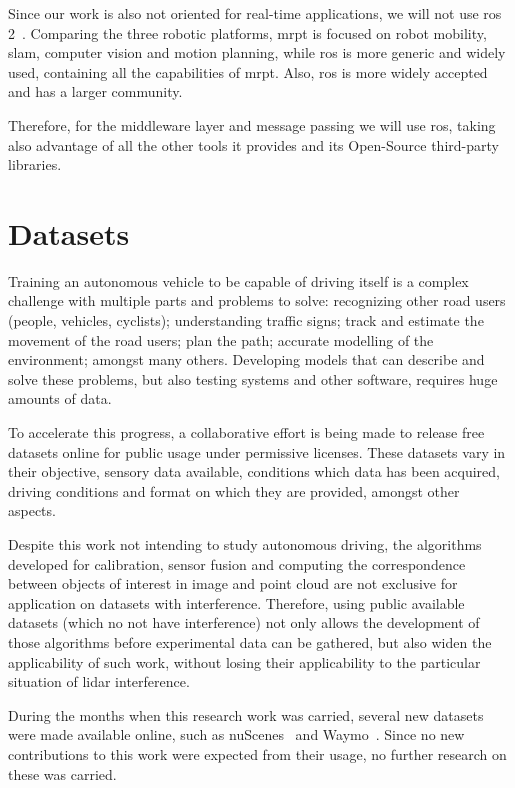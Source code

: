 Since our work is also not oriented for real-time applications, we will not use \ac{ros} 2~\cite{ROS2}. Comparing the three robotic platforms, \ac{mrpt} is focused on robot mobility, \ac{slam}, computer vision and motion planning, while \ac{ros} is more generic and widely used, containing all the capabilities of \ac{mrpt}. Also, \ac{ros} is more widely accepted and has a larger community.

Therefore, for the middleware layer and message passing we will use \ac{ros}, taking also advantage of all the other tools it provides and its Open-Source third-party libraries.



\section{Datasets}
\label{sec:sota:datasets}

Training an autonomous vehicle to be capable of driving itself is a complex challenge with multiple parts and problems to solve: recognizing other road users (people, vehicles, cyclists); understanding traffic signs; track and estimate the movement of the road users; plan the path; accurate modelling of the environment; amongst many others. Developing models that can describe and solve these problems, but also testing systems and other software, requires huge amounts of data.

To accelerate this progress, a collaborative effort is being made to release free datasets online for public usage under permissive licenses. These datasets vary in their objective, sensory data available, conditions which data has been acquired, driving conditions and format on which they are provided, amongst other aspects. 

Despite this work not intending to study autonomous driving, the algorithms developed for calibration, sensor fusion and computing the correspondence between objects of interest in image and point cloud are not exclusive for application on datasets with interference. Therefore, using public available datasets (which no not have interference) not only allows the development of those algorithms before experimental data can be gathered, but also widen the applicability of such work, without losing their applicability to the particular situation of \ac{lidar} interference.

During the months when this research work was carried, several new datasets were made available online, such as nuScenes~\cite{nuScenes2019} and Waymo~\cite{Waymo}. Since no new contributions to this work were expected from their usage, no further research on these was carried. 

